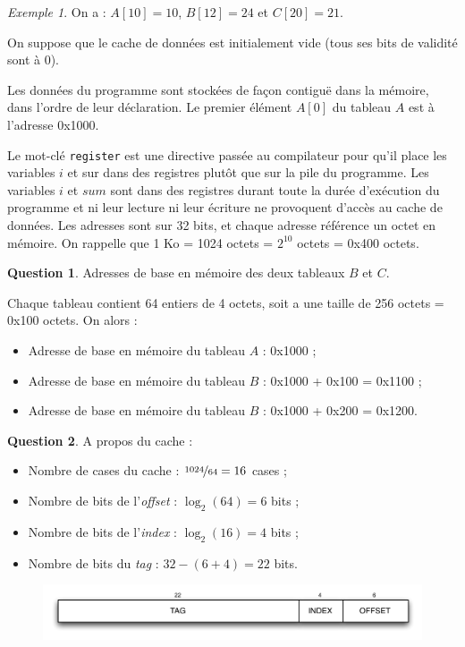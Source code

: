 \documentclass[11pt,english,french]{scrreprt}
\theoremstyle{remark}
\newtheorem*{ex*}{Exemple}
\theoremstyle{definition}
\newtheorem{ques}{Question}[section]
\begin{document}
\begin{ex*}
	On a : $A[10] = 10$, $B[12] = 24$ et $C[20] = 21$.
\end{ex*}

On suppose que le cache de données est initialement vide (tous ses bits de validité sont à 0).

Les données du programme sont stockées de façon contiguë dans la mémoire, dans l'ordre
de leur déclaration. Le premier élément $A[0]$ du tableau $A$ est à l'adresse 0x1000.

Le mot-clé \lstinline!register! est une directive passée au compilateur pour qu'il place les variables $i$ et sur dans des registres plutôt que sur la pile du programme. Les variables $i$ et $sum$ sont dans des registres durant toute la durée d'exécution du programme et ni leur lecture ni leur écriture ne provoquent d'accès au cache de données.
Les adresses sont sur 32 bits, et chaque adresse référence un octet en mémoire. On rappelle que 1 Ko = 1024 octets = $2^{10}$ octets = 0x400 octets.

\begin{ques}
	Adresses de base en mémoire des deux tableaux $B$ et $C$.
	
	Chaque tableau contient 64 entiers de 4 octets, soit a une taille de 256 octets = 0x100 octets. On alors : \begin{itemize}
		\item Adresse de base en mémoire du tableau $A$ : 0x1000 ;
		\item Adresse de base en mémoire du tableau $B$ : 0x1000 + 0x100 = 0x1100 ;
		\item Adresse de base en mémoire du tableau $B$ : 0x1000 + 0x200 = 0x1200.
	\end{itemize}
\end{ques}

\begin{ques}
	A propos du cache : \begin{itemize}
		\item Nombre de cases du cache : $\nicefrac{1024}{64} = 16$ cases ;
		\item Nombre de bits de l'\emph{offset} : $\log_2(64) = 6$ bits ;
		\item Nombre de bits de l'\emph{index} : $\log_2(16) = 4$ bits ;
		\item Nombre de bits du \emph{tag} : $32 - (6+4) = 22$ bits.
	\end{itemize}
	
	\begin{figure}[h]
		\center
		\includegraphics[scale=.9]{diagrammes/part-adresse}
	\end{figure}
\end{ques}
\end{document}
